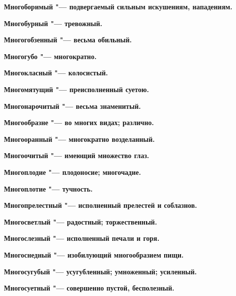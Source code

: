 \bfseries Многоборимый \normalfont{} "--- подвергаемый сильным искушениям, нападениям. 




\bfseries Многобурный \normalfont{} "--- тревожный. 




\bfseries Многогобзенный \normalfont{} "--- весьма обильный. 




\bfseries Многогубо \normalfont{} "--- многократно. 




\bfseries Многокласный \normalfont{} "--- колосистый. 




\bfseries Многомятущий \normalfont{} "--- преисполненный суетою. 




\bfseries Многонарочитый \normalfont{} "--- весьма знаменитый. 




\bfseries Многообразне \normalfont{} "--- во многих видах; различно. 




\bfseries Многооранный \normalfont{} "--- многократно возделанный. 




\bfseries Многоочитый \normalfont{} "--- имеющий множество глаз. 




\bfseries Многоплодие \normalfont{} "--- плодоносие; многочадие. 




\bfseries Многоплотие \normalfont{} "--- тучность. 




\bfseries Многопрелестный \normalfont{} "--- исполненный прелестей и соблазнов. 




\bfseries Многосветлый \normalfont{} "--- радостный; торжественный. 




\bfseries Многослезный \normalfont{} "--- исполненный печали и горя. 




\bfseries Многоснедный \normalfont{} "--- изобилующий многообразием пищи. 




\bfseries Многосугубый \normalfont{} "--- усугубленный; умноженный; усиленный. 




\bfseries Многосуетный \normalfont{} "--- совершенно пустой, бесполезный. 




